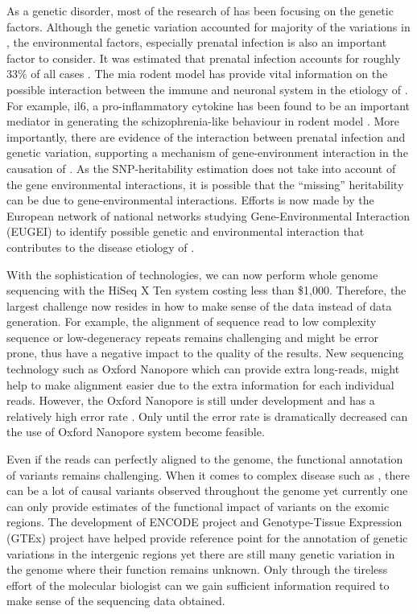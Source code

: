 \documentclass[12pt]{book}
\newcommand*{\glng}{\glsentrylong}
\begin{document}
	As a genetic disorder, most of the research of \glng{scz} has been focusing on the genetic factors. 
	Although the genetic variation accounted for majority of the variations in \glng{scz}, the environmental factors, especially prenatal infection is also an important factor to consider. 
	It was estimated that prenatal infection accounts for roughly 33\% of all \glng{scz} cases \citep{Brown2010}.
	The \gls{mia} rodent model has provide vital information on the possible interaction between the immune and neuronal system in the etiology of \glng{scz} \citep{Meyer2007a}.
	For example, \gls{il6}, a pro-inflammatory cytokine has been found to be an important mediator in generating the schizophrenia-like behaviour in rodent model \citep{Smith2007}.
	More importantly, there are evidence of the interaction between prenatal infection and genetic variation, supporting a mechanism of gene-environment interaction in the causation of \glng{scz} \citep{Clarke2009}.
	As the \gls{SNP}-heritability estimation does not take into account of the gene environmental interactions, it is possible that the ``missing'' heritability can be due to gene-environmental interactions. 
	Efforts is now made by the European network of national \glng{scz} networks studying Gene-Environmental Interaction (EUGEI) to identify possible genetic and environmental interaction that contributes to the disease etiology of \glng{scz}.
	
	
	With the sophistication of technologies, we can now perform whole genome sequencing with the HiSeq \RN{10} Ten system costing less than \$1,000. 
	Therefore, the largest challenge now resides in how to make sense of the data instead of data generation.
	For example, the alignment of sequence read to low complexity sequence or low-degeneracy repeats remains challenging and might be error prone, thus have a negative impact to the quality of the results\citep{Sims2014}. 
	New sequencing technology such as Oxford Nanopore which can provide extra long-reads, might help to make alignment easier due to the extra information for each individual reads.
	However, the Oxford Nanopore is still under development and has a relatively high error rate \citep{Mikheyev2014}. 
	Only until the error rate is dramatically decreased can the use of Oxford Nanopore system become feasible. 
	
	Even if the reads can perfectly aligned to the genome, the functional annotation of variants remains challenging.
	When it comes to complex disease such as \glng{scz}, there can be a lot of causal variants observed throughout the genome yet currently one can only provide estimates of the functional impact of variants on the exomic regions.
	The development of ENCODE project \citep{ENCODEProjectConsortium2012} and Genotype-Tissue Expression (GTEx) project \citep{Consortium2015} have helped provide reference point for the annotation of genetic variations in the intergenic regions yet there are still many genetic variation in the genome where their function remains unknown. 
	Only through the tireless effort of the molecular biologist can we gain sufficient information required to make sense of the sequencing data obtained.	
	
\end{document}
